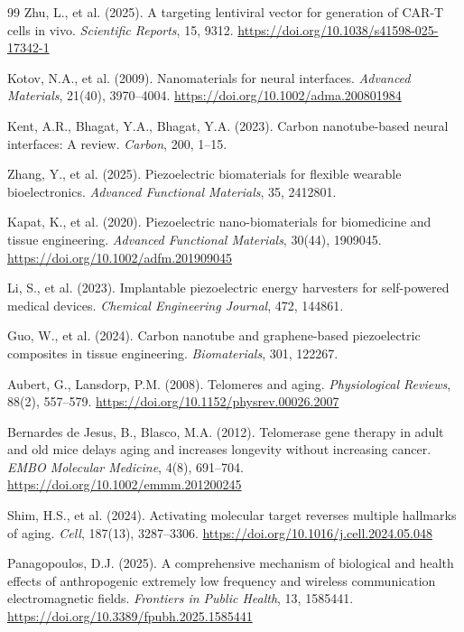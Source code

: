 \documentclass[12pt]{article}
\begin{document}
\begin{thebibliography}{99}
Zhu, L., et al. (2025).
A targeting lentiviral vector for generation of CAR-T cells in vivo.
\textit{Scientific Reports}, 15, 9312.
\url{https://doi.org/10.1038/s41598-025-17342-1}

Kotov, N.A., et al. (2009).
Nanomaterials for neural interfaces.
\textit{Advanced Materials}, 21(40), 3970--4004.
\url{https://doi.org/10.1002/adma.200801984}

Kent, A.R., Bhagat, Y.A., Bhagat, Y.A. (2023).
Carbon nanotube-based neural interfaces: A review.
\textit{Carbon}, 200, 1--15.

Zhang, Y., et al. (2025).
Piezoelectric biomaterials for flexible wearable bioelectronics.
\textit{Advanced Functional Materials}, 35, 2412801.

Kapat, K., et al. (2020).
Piezoelectric nano-biomaterials for biomedicine and tissue engineering.
\textit{Advanced Functional Materials}, 30(44), 1909045.
\url{https://doi.org/10.1002/adfm.201909045}

Li, S., et al. (2023).
Implantable piezoelectric energy harvesters for self-powered medical devices.
\textit{Chemical Engineering Journal}, 472, 144861.

Guo, W., et al. (2024).
Carbon nanotube and graphene-based piezoelectric composites in tissue engineering.
\textit{Biomaterials}, 301, 122267.

Aubert, G., Lansdorp, P.M. (2008).
Telomeres and aging.
\textit{Physiological Reviews}, 88(2), 557--579.
\url{https://doi.org/10.1152/physrev.00026.2007}

Bernardes de Jesus, B., Blasco, M.A. (2012).
Telomerase gene therapy in adult and old mice delays aging and increases longevity without increasing cancer.
\textit{EMBO Molecular Medicine}, 4(8), 691--704.
\url{https://doi.org/10.1002/emmm.201200245}

Shim, H.S., et al. (2024).
Activating molecular target reverses multiple hallmarks of aging.
\textit{Cell}, 187(13), 3287--3306.
\url{https://doi.org/10.1016/j.cell.2024.05.048}

Panagopoulos, D.J. (2025).
A comprehensive mechanism of biological and health effects of anthropogenic extremely low frequency and wireless communication electromagnetic fields.
\textit{Frontiers in Public Health}, 13, 1585441.
\url{https://doi.org/10.3389/fpubh.2025.1585441}


\end{thebibliography}
\end{document}
